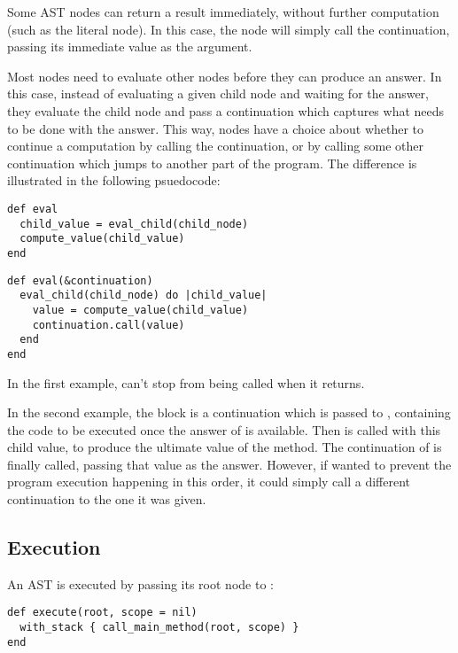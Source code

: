 Some AST nodes can return a result immediately, without further computation (such as the literal  node). In this case, the node will simply call the continuation, passing its immediate value as the argument.

Most nodes need to evaluate other nodes before they can produce an answer. In this case, instead of evaluating a given child node and waiting for the answer, they evaluate the child node and pass a continuation which captures what needs to be done with the answer. This way, nodes have a choice about whether to continue a computation by calling the continuation, or by calling some other continuation which jumps to another part of the program. The difference is illustrated in the following psuedocode:

\begin{lstlisting}[title={\textbf{Without CPS}}]
def eval
  child_value = eval_child(child_node)
  compute_value(child_value)
end
\end{lstlisting}

\begin{lstlisting}[title={\textbf{With CPS}}]
def eval(&continuation)
  eval_child(child_node) do |child_value|
    value = compute_value(child_value)
    continuation.call(value)
  end
end
\end{lstlisting}

In the first example,  can't stop  from being called when it returns.

In the second example, the  block is a continuation which is passed to , containing the code to be executed once the answer of  is available. Then  is called with this child value, to produce the ultimate value of the  method. The continuation of  is finally called, passing that value as the answer. However, if  wanted to prevent the program execution happening in this order, it could simply call a different continuation to the one it was given.

\subsection{Execution}

An AST is executed by passing its root node to :

\begin{lstlisting}
def execute(root, scope = nil)
  with_stack { call_main_method(root, scope) }
end
\end{lstlisting}

